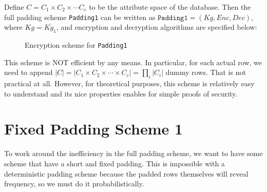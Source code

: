 Define $C = C_1 \times C_2 \times \cdots C_c$ to be the attribute space of the database. Then the full padding scheme \texttt{Padding1} can be written as $\texttt{{Padding1}} = (Kg, Enc, Dec)$, where $Kg = \overbar{Kg_1}$, and encryption and decryption algorithms are specified below:

\begin{figure}[H]
\begin{center}
\begin{pchstack}
	
	\pchspace
\end{pchstack}
\end{center}
\caption{Encryption scheme for \texttt{Padding1}}
\end{figure}


This scheme is NOT efficient by any means. In particular, for each actual row, we need to append $|C| = |C_1 \times C_2 \times \cdots \times C_c| = \prod_i |C_i|$ dummy rows. That is not practical at all. However, for theoretical purposes, this scheme is relatively easy to understand and its nice properties enables for simple proofs of security.


\section{Fixed Padding Scheme 1}
To work around the inefficiency in the full padding scheme, we want to have some scheme that have a short and fixed padding. This is impossible with a deterministic padding scheme because the padded rows themselves will reveal frequency, so we must do it probabilistically.


